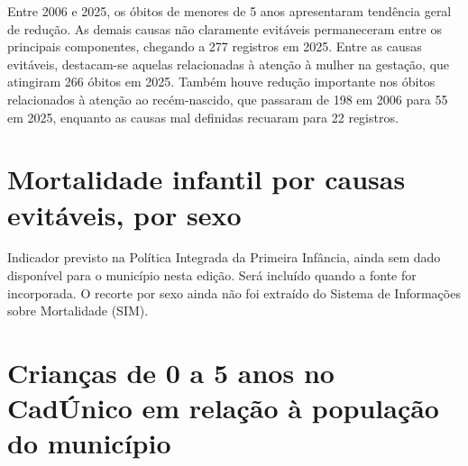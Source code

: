 
Entre 2006 e 2025, os óbitos de menores de 5 anos apresentaram tendência geral de redução. As demais causas não claramente evitáveis permaneceram entre os principais componentes, chegando a 277 registros em 2025. Entre as causas evitáveis, destacam-se aquelas relacionadas à atenção à mulher na gestação, que atingiram 266 óbitos em 2025. Também houve redução importante nos óbitos relacionados à atenção ao recém-nascido, que passaram de 198 em 2006 para 55 em 2025, enquanto as causas mal definidas recuaram para 22 registros.


\section{Mortalidade infantil por causas evitáveis, por sexo}

\begin{pendente}Indicador previsto na Política Integrada da Primeira Infância, ainda sem dado disponível para o município nesta edição. Será incluído quando a fonte for incorporada. O recorte por sexo ainda não foi extraído do Sistema de Informações sobre Mortalidade (SIM).\end{pendente}

\section{Crianças de 0 a 5 anos no CadÚnico em relação à população do município}

